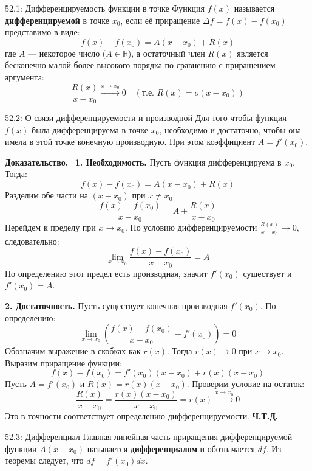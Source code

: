 \documentclass[a4paper,12pt]{article}
\newcommand{\myproof}{\textbf{Доказательство.}\ }
\begin{document}
	\begin{definitionbox}{52.1: Дифференцируемость функции в точке}
		Функция $f(x)$ называется \textbf{дифференцируемой} в точке $x_0$, если её приращение $\Delta f = f(x) - f(x_0)$ представимо в виде:
		$$ f(x) - f(x_0) = A(x - x_0) + R(x) $$
		где $A$ — некоторое число ($A \in \mathbb{R}$), а остаточный член $R(x)$ является бесконечно малой более высокого порядка по сравнению с приращением аргумента:
		$$ \frac{R(x)}{x - x_0} \xrightarrow{x \to x_0} 0 \quad (\text{т.е. } R(x) = o(x - x_0)) $$
	\end{definitionbox}
	
	\begin{theorembox}{52.2: О связи дифференцируемости и производной}
		Для того чтобы функция $f(x)$ была дифференцируема в точке $x_0$, необходимо и достаточно, чтобы она имела в этой точке конечную производную. При этом коэффициент $A = f'(x_0)$.
	\end{theorembox}
	
	\vspace{0.5cm}
	\myproof
	\textbf{1. Необходимость.} Пусть функция дифференцируема в $x_0$. Тогда:
	$$ f(x) - f(x_0) = A(x - x_0) + R(x) $$
	Разделим обе части на $(x - x_0)$ при $x \neq x_0$:
	$$ \frac{f(x) - f(x_0)}{x - x_0} = A + \frac{R(x)}{x - x_0} $$
	Перейдем к пределу при $x \to x_0$. По условию дифференцируемости $\frac{R(x)}{x - x_0} \to 0$, следовательно:
	$$ \lim_{x \to x_0} \frac{f(x) - f(x_0)}{x - x_0} = A $$
	По определению этот предел есть производная, значит $f'(x_0)$ существует и $f'(x_0) = A$.
	
	\textbf{2. Достаточность.} Пусть существует конечная производная $f'(x_0)$. По определению:
	$$ \lim_{x \to x_0} \left( \frac{f(x) - f(x_0)}{x - x_0} - f'(x_0) \right) = 0 $$
	Обозначим выражение в скобках как $r(x)$. Тогда $r(x) \to 0$ при $x \to x_0$. Выразим приращение функции:
	$$ f(x) - f(x_0) = f'(x_0)(x - x_0) + r(x)(x - x_0) $$
	Пусть $A = f'(x_0)$ и $R(x) = r(x)(x - x_0)$. Проверим условие на остаток:
	$$ \frac{R(x)}{x - x_0} = \frac{r(x)(x - x_0)}{x - x_0} = r(x) \xrightarrow{x \to x_0} 0 $$
	Это в точности соответствует определению дифференцируемости. \textbf{Ч.Т.Д.}
	
	\vspace{0.5cm}
	\begin{notebook}{52.3: Дифференциал}
		Главная линейная часть приращения дифференцируемой функции $A(x-x_0)$ называется \textbf{дифференциалом} и обозначается $df$. Из теоремы следует, что $df = f'(x_0)dx$.
	\end{notebook}
	
\end{document}
